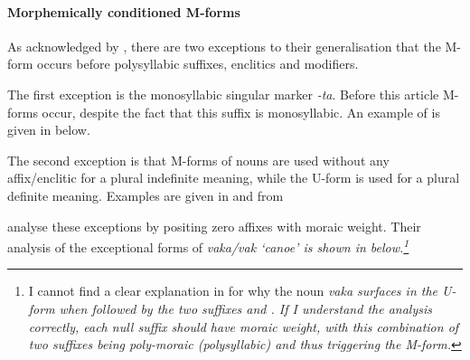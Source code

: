 \paragraph{Morphemically conditioned M-forms}
As acknowledged by \citet{haki98},
there are two exceptions to their generalisation
that the M-form occurs before polysyllabic suffixes,
enclitics and modifiers.

The first exception is the monosyllabic singular marker \emph{-ta}.
Before this article M-forms occur, despite the fact that this suffix is monosyllabic.
An example of is given in  below.

\begin{exe}
\let\eachwordone=\textit
	\label{RotUse6}
\end{exe}

The second exception is that M-forms of nouns are used without any
affix/enclitic for a plural indefinite meaning,
while the U-form is used for a plural definite meaning.
Examples are given in  and 
from \citet[15]{ch40}

\begin{multicols}{2}
	\begin{exe}\let\eachwordone=\it
		\label{ex:RotDef}
		\label{ex:RotInd}
	\end{exe}
\end{multicols}

\citet[121f]{haki98} analyse these exceptions by positing zero affixes with moraic weight.
Their analysis of the exceptional forms of \it{vaka/vak} `canoe'
is shown in  below.\footnote{
	I cannot find a clear explanation in \cite{haki98} for why the noun \it{vaka}
	surfaces in the U-form when followed by the two suffixes
	{\0} and {\0}.
	If I understand the analysis correctly,
	each null suffix should have moraic weight,
	with this combination of two suffixes being poly-moraic (polysyllabic)
	and thus triggering the M-form.}

